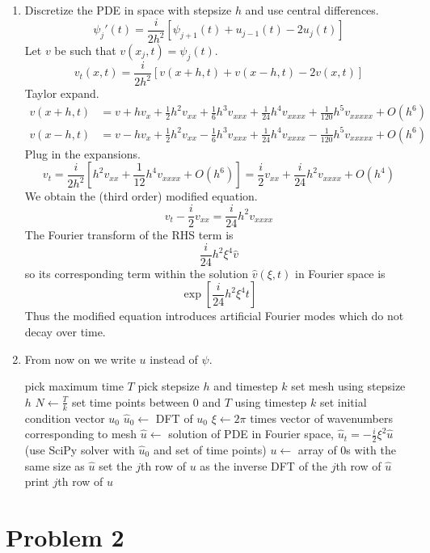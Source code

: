 \documentclass{article}
\newcommand{\sbr}[1]{\left[#1\right]}
\begin{document}
\begin{enumerate}[label=(\alph*)]
\item
Discretize the PDE in space with stepsize $h$ and use central differences.
$$\psi_j'(t) = \frac{i}{2h^2}[\psi_{j+1}(t) + u_{j-1}(t) - 2u_j(t)]$$
Let $v$ be such that $v(x_j,t)=\psi_j(t)$.
$$v_t(x,t) = \frac{i}{2h^2}[v(x+h,t) + v(x-h,t) - 2v(x,t)]$$
Taylor expand.
\begin{align*}
	v(x+h,t) &= v + hv_x + \frac12h^2v_{xx} + \frac16h^3v_{xxx} + \frac{1}{24}h^4v_{xxxx} + \frac{1}{120}h^5v_{xxxxx} + O(h^6)\\
	v(x-h,t) &= v - hv_x + \frac12h^2v_{xx} - \frac16h^3v_{xxx} + \frac{1}{24}h^4v_{xxxx} - \frac{1}{120}h^5v_{xxxxx} + O(h^6)
\end{align*}
Plug in the expansions.
$$v_t = \frac{i}{2h^2}\sbr{h^2v_{xx} + \frac{1}{12}h^4v_{xxxx} + O(h^6)}
= \frac i2v_{xx} + \frac{i}{24}h^2v_{xxxx} + O(h^4)$$
We obtain the (third order) modified equation.
$$v_t - \frac i2v_{xx} = \frac{i}{24}h^2v_{xxxx}$$
The Fourier transform of the RHS term is
$$\frac{i}{24}h^2\xi^4\hat v$$
so its corresponding term within the solution $\hat v(\xi,t)$ in Fourier space is
$$\exp[\frac{i}{24}h^2\xi^4t]$$
Thus the modified equation introduces artificial Fourier modes which do not decay over time.


\item
From now on we write $u$ instead of $\psi$.
\begin{algorithmic}
	\State pick maximum time $T$
	\State pick stepsize $h$ and timestep $k$
	\State set mesh using stepsize $h$
	\State $N \gets \frac Tk$
	\State set time points between 0 and $T$ using timestep $k$
	\State set initial condition vector $u_0$
	\State $\hat u_0 \gets$ DFT of $u_0$
	\State $\xi \gets 2\pi$ times vector of wavenumbers corresponding to mesh
	\State $\hat u \gets$ solution of PDE in Fourier space, $\hat u_t=-\frac i2\xi^2\hat u$ (use SciPy solver with $\hat u_0$ and set of time points)
	\State $u \gets$ array of 0s with the same size as $\hat u$
		\State set the $j$th row of $u$ as the inverse DFT of the $j$th row of $\hat u$
	\EndFor
			\State print $j$th row of $u$
		\EndIf
	\EndFor
\end{algorithmic}

\end{enumerate}



\section*{Problem 2}
\end{document}
